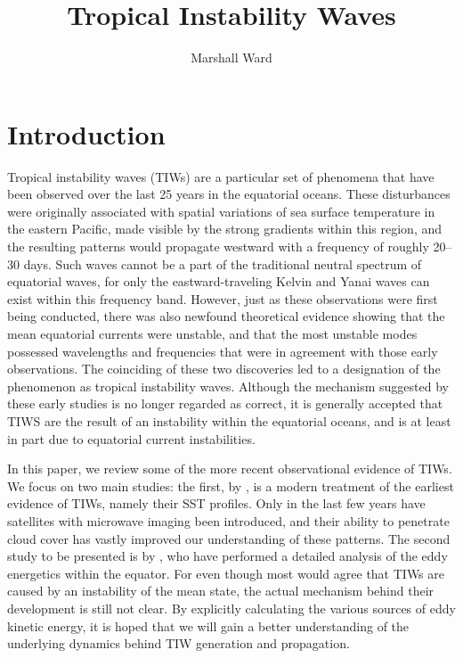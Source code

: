 \documentclass[letterpaper, 11pt, onecolumn]{article}
\title{Tropical Instability Waves}
\author{Marshall Ward}
\begin{document}
\maketitle

\section{Introduction}

Tropical instability waves (TIWs) are a particular set of phenomena that have
been observed over the last 25 years in the equatorial oceans. These
disturbances were originally associated with spatial variations of sea surface
temperature in the eastern Pacific, made visible by the strong gradients within
this region, and the resulting patterns would propagate westward with a
frequency of roughly 20--30 days. Such waves cannot be a part of the
traditional neutral spectrum of equatorial waves, for only the
eastward-traveling Kelvin and Yanai waves can exist within this frequency band.
However, just as these observations were first being conducted, there was also
newfound theoretical evidence showing that the mean equatorial currents were
unstable, and that the most unstable modes possessed wavelengths and
frequencies that were in agreement with those early observations. The
coinciding of these two discoveries led to a designation of the phenomenon as
tropical instability waves. Although the mechanism suggested by these early
studies is no longer regarded as correct, it is generally accepted that TIWS
are the result of an instability within the equatorial oceans, and is at least
in part due to equatorial current instabilities.

In this paper, we review some of the more recent observational evidence of
TIWs. We focus on two main studies: the first, by \citet{Chelton++:2000}, is a
modern treatment of the earliest evidence of TIWs, namely their SST profiles.
Only in the last few years have satellites with microwave imaging been
introduced, and their ability to penetrate cloud cover has vastly improved our
understanding of these patterns. The second study to be presented is by
\citet{Qiao-Weisberg:1998}, who have performed a detailed analysis of the eddy
energetics within the equator. For even though most would agree that TIWs are
caused by an instability of the mean state, the actual mechanism behind their
development is still not clear. By explicitly calculating the various sources
of eddy kinetic energy, it is hoped that we will gain a better understanding of
the underlying dynamics behind TIW generation and propagation.
\end{document}
